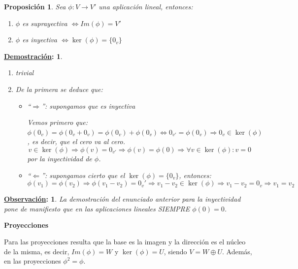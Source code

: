 \documentclass[10pt,a4paper,openright]{book}
\theoremstyle{break}
\newtheorem*{prop}{Proposición}
\newtheorem*{demo}{\underline{Demostración}:}
\newtheorem*{obs}{\underline{Observación}:}
\begin{document}
\begin{prop}
Sea $\phi: V\longrightarrow V'$ una aplicación lineal, entonces:
\begin{enumerate}
\item $\phi$ es suprayectiva $\Leftrightarrow Im(\phi)=V'$
\item $\phi$ es inyectiva $\Leftrightarrow \ker(\phi)=\{0_v\}$
\end{enumerate}
\end{prop}
\begin{demo}
\begin{enumerate}
\item trivial

\item De la primera se deduce que:
\begin{itemize}
\item ``$\Rightarrow$'': supongamos que es inyectiva\par
Vemos primero que: $\phi(0_v)=\phi(0_v+0_v)=\phi(0_v)+\phi(0_v)\Leftrightarrow 0_{v'}=\phi(0_v)\Rightarrow 0_v\in \ker(\phi)$, es decir, que el cero va al cero.
$$
v\in \ker(\phi)\Rightarrow \phi(v)=0_{v'}\Rightarrow \phi(v) = \phi(0)\Rightarrow \forall v\in \ker(\phi) : v=0
$$
por la inyectividad de $\phi$.

\item ``$\Leftarrow$'': supongamos cierto que el $\ker(\phi)=\{0_v\}$, entonces:
$$
\phi(v_1)=\phi(v_2)\Rightarrow \phi(v_1-v_2)=0_v'\Rightarrow v_1-v_2\in \ker(\phi)\Rightarrow v_1-v_2=0_v\Rightarrow v_1=v_2
$$
\end{itemize}
\end{enumerate}
\end{demo}

\begin{obs}
La demostración del enunciado anterior para la inyectividad pone de manifiesto que en las aplicaciones lineales SIEMPRE $\phi(0) = 0$.
\end{obs}

\textbf{Proyecciones}\par

Para las proyecciones resulta que la base es la imagen y la dirección es el núcleo de la misma, es decir, $Im(\phi)=W$ y $\ker(\phi)=U$, siendo $V=W\oplus U$. Además, en las proyecciones $\phi^2=\phi$.\par
\end{document}
